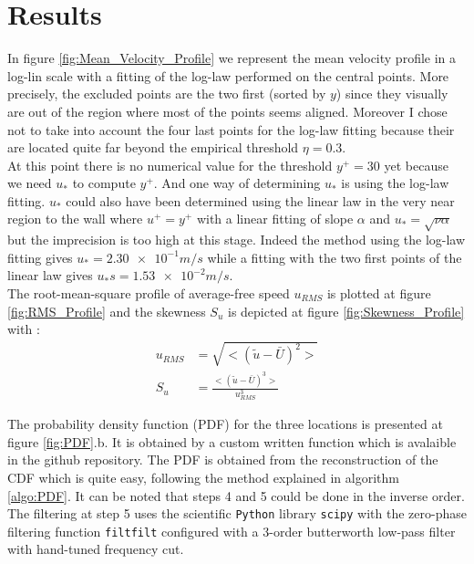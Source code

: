 \documentclass[12pt]{article}
\begin{document}

\newpage
\section{Results}

In figure \ref{fig:Mean_Velocity_Profile} we represent the mean velocity profile in a log-lin scale with a fitting of the log-law performed on the central points. More precisely, the excluded points are the two first (sorted by $y$) since they visually are out of the region where most of the points seems aligned.  Moreover I chose not to take into account the four last points for the log-law fitting because their are located quite far beyond the empirical threshold $\eta = 0.3$. \\

At this point there is no numerical value for the threshold $y^+=30$ yet because we need $u_*$ to compute $y^+$. And one way of determining $u_*$ is using the log-law fitting. $u_*$ could also have been determined using the linear law in the very near region to the wall where $u^+ = y^+$ with a linear fitting of slope $\alpha$ and $u_* = \sqrt{\nu\alpha}$ but the imprecision is too high at this stage. Indeed the method using the log-law fitting gives $u_* = \num{2.30e-1} \si{m/s}$ while a fitting with the two first points of the linear law gives $u_*s = \num{1.53e-2} \si{m/s}$.\\

The root-mean-square profile of average-free speed $u_{RMS}$ is plotted at figure \ref{fig:RMS_Profile} and the skewness $S_u$ is depicted at figure \ref{fig:Skewness_Profile} with :\\

\begin{align}
    u_{RMS} &= \sqrt{<\left(\tilde{u}-\bar{U}\right)^2>} \\
    S_u &= \frac{<\left(\tilde{u}-\bar{U}\right)^3>}{u_{RMS}^3}
\end{align}

The probability density function (PDF) for the three locations is presented at figure \ref{fig:PDF}.b. It is obtained by a custom written function which is avalaible in the github repository. The PDF is obtained from the reconstruction of the CDF which is quite easy, following the method explained in algorithm \ref{algo:PDF}. It can be noted that steps 4 and 5 could be done in the inverse order. The filtering at step 5 uses the scientific \verb|Python| library \verb|scipy| with the zero-phase filtering function \verb|filtfilt| configured with a 3-order butterworth low-pass filter with hand-tuned frequency cut.\\
\end{document}
